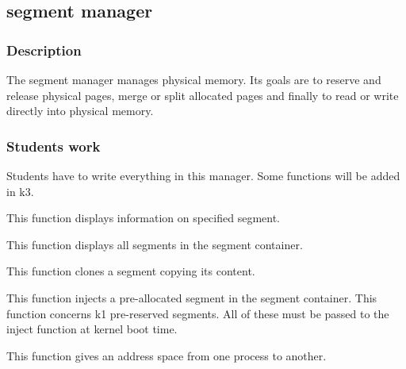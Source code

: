 %
%

\subsection{segment manager}

\subsubsection{Description}

The segment manager manages physical  memory. Its goals are to reserve
and release physical pages, merge or split allocated pages and finally
to read or write directly into physical memory.

\subsubsection{Students work}

Students have to write everything in this manager. Some functions will
be added in k3.


This function displays information on specified segment.


This function displays all segments in the segment container.


This function clones a segment copying its content.


This  function   injects  a  pre-allocated  segment   in  the  segment
container.  This function  concerns k1  pre-reserved segments.  All of
these must be passed to the inject function at kernel boot time.


This function gives an address space from one process to another.


